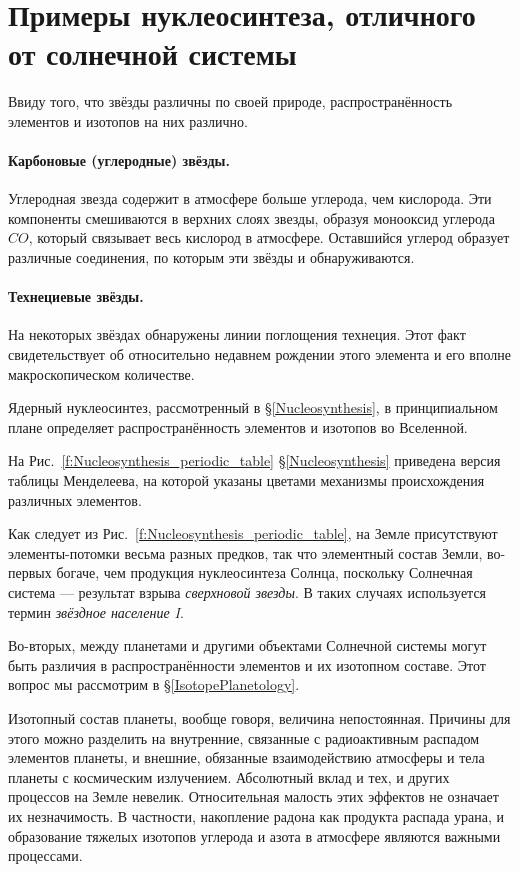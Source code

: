 \documentclass[a5paper,openany]{book}
\begin{document}
		\section{Примеры нуклеосинтеза, отличного от солнечной системы}	
	
	Ввиду того, что звёзды различны по своей природе, распространённость элементов и изотопов на них различно.
	
	\paragraph{Карбоновые (углеродные) звёзды.}
	Углеродная звезда содержит в атмосфере больше углерода, чем кислорода. Эти компоненты смешиваются в верхних слоях звезды, образуя монооксид углерода $CO$, который связывает весь кислород в атмосфере. Оставшийся углерод образует различные соединения, по которым эти звёзды и обнаруживаются. 	
	
	\paragraph{Технециевые звёзды.} 
	На некоторых звёздах обнаружены линии поглощения технеция. Этот факт свидетельствует об относительно недавнем рождении этого элемента и его вполне макроскопическом количестве.
	
	
	Ядерный нуклеосинтез, рассмотренный в \S\ref{Nucleosynthesis}, в принципиальном плане определяет распространённость элементов и изотопов во Вселенной. 
	
	На Рис.~\ref{f:Nucleosynthesis_periodic_table} \S\ref{Nucleosynthesis} приведена версия таблицы Менделеева, на которой указаны цветами  механизмы происхождения различных элементов.
	
	
	Как следует из Рис.~\ref{f:Nucleosynthesis_periodic_table}, на Земле присутствуют элементы-потомки весьма разных предков, так что элементный состав Земли, во-первых богаче, чем продукция нуклеосинтеза Солнца, поскольку Солнечная система --- результат взрыва \emph{сверхновой звезды}. В таких случаях используется термин \emph{звёздное население I}.  
	
	Во-вторых, между планетами и другими объектами Солнечной системы могут быть различия в распространённости элементов и их изотопном составе. Этот вопрос мы рассмотрим в \S\ref{IsotopePlanetology}.
	
	Изотопный состав планеты, вообще говоря, величина непостоянная. Причины для этого можно разделить на внутренние, связанные с радиоактивным распадом элементов планеты, и внешние, обязанные взаимодействию атмосферы и тела планеты с космическим излучением. Абсолютный вклад и тех, и других процессов на Земле невелик. Относительная малость этих эффектов не означает их незначимость. В частности, накопление радона как продукта распада урана, и образование тяжелых изотопов углерода и азота в атмосфере являются важными процессами.
	
\end{document}
